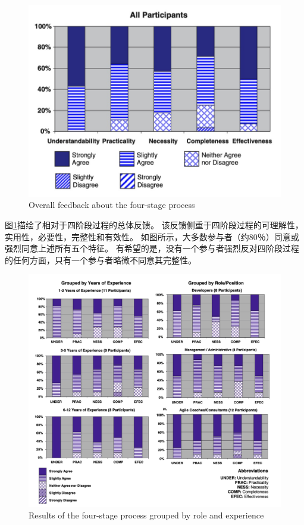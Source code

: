 \documentclass[twocolumn]{svjour3}[]
\begin{document}
\begin{figure} [htb]
    \centering
    \includegraphics[width=1.0\linewidth]{img/fig7.jpg}
    \caption{Overall feedback about the four-stage process}
    \label{fig.7}
\end{figure}

图\ref{fig.7}描绘了相对于四阶段过程的总体反馈。 该反馈侧重于四阶段过程的可理解性，实用性，必要性，完整性和有效性。 如图所示，大多数参与者（约80％）同意或强烈同意上述所有五个特征。 有希望的是，没有一个参与者强烈反对四阶段过程的任何方面，只有一个参与者略微不同意其完整性。

\begin{figure} [htb]
    \centering
    \includegraphics[width=1.0\textwidth]{img/fig8.jpg}
    \caption{Results of the four-stage process grouped by role and experience}
    \label{fig.8}
\end{figure}
\end{document}
